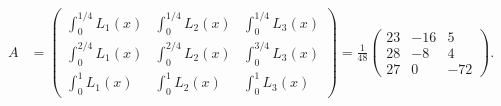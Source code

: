 \begin{solution}
\begin{align*}
A &= \begin{pmatrix}
  \int_0^{1/4} L_1(x) & \int_0^{1/4} L_2(x) & \int_0^{1/4} L_3(x)\\
  \int_0^{2/4} L_1(x) & \int_0^{2/4} L_2(x) & \int_0^{3/4} L_3(x)\\
  \int_0^1 L_1(x) & \int_0^1 L_2(x) & \int_0^1 L_3(x)
\end{pmatrix}
= \frac{1}{48}\begin{pmatrix}
  23 & -16 & 5\\
  28 & -8 & 4\\
  27 & 0 & -72
\end{pmatrix}.
\end{align*}
\end{solution}
